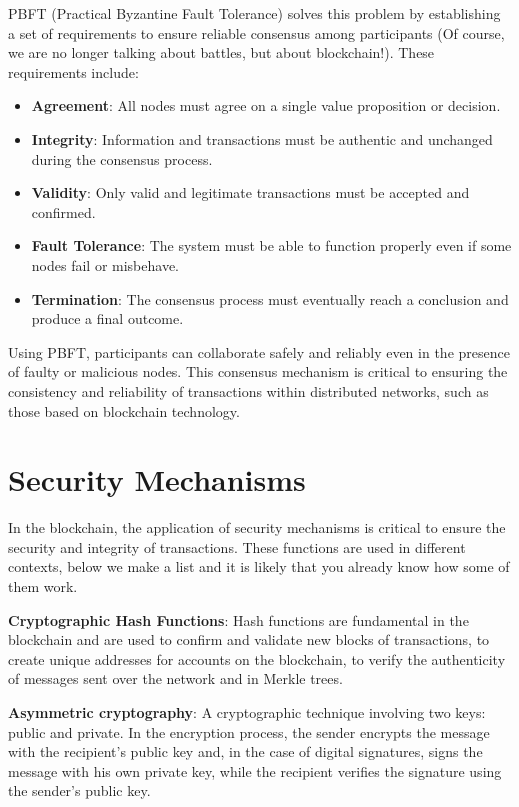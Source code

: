 PBFT (Practical Byzantine Fault Tolerance) solves this problem by establishing a set of requirements to ensure reliable consensus among participants (Of course, we are no longer talking about battles, but about blockchain!). These requirements include:
\begin{itemize}
    \item \textbf{Agreement}: All nodes must agree on a single value proposition or decision.
    \item \textbf{Integrity}: Information and transactions must be authentic and unchanged during the consensus process.
    \item \textbf{Validity}: Only valid and legitimate transactions must be accepted and confirmed.
    \item \textbf{Fault Tolerance}: The system must be able to function properly even if some nodes fail or misbehave.
    \item \textbf{Termination}: The consensus process must eventually reach a conclusion and produce a final outcome.
\end{itemize}
Using PBFT, participants can collaborate safely and reliably even in the presence of faulty or malicious nodes. This consensus mechanism is critical to ensuring the consistency and reliability of transactions within distributed networks, such as those based on blockchain technology.

\vspace{2cm}
\section{Security Mechanisms}
In the blockchain, the application of security mechanisms is critical to ensure the security and integrity of transactions. These functions are used in different contexts, below we make a list and it is likely that you already know how some of them work.

\begin{remark}
\textbf{Cryptographic Hash Functions}:
Hash functions are fundamental in the blockchain and are used to confirm and validate new blocks of transactions, to create unique addresses for accounts on the blockchain, to verify the authenticity of messages sent over the network and in Merkle trees.
\end{remark}

\begin{remark2}
\textbf{Asymmetric cryptography}:
A cryptographic technique involving two keys: public and private. 
In the encryption process, the sender encrypts the message with the recipient's public key and, in the case of digital signatures, signs the message with his own private key, while the recipient verifies the signature using the sender's public key.
\end{remark2}

